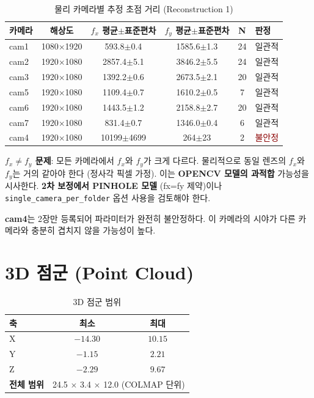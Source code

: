 \documentclass[11pt, a4paper]{report}
\begin{document}
\begin{table}[H]
\centering
\caption{물리 카메라별 추정 초점 거리 (Reconstruction 1)}
\renewcommand{\arraystretch}{1.3}
\small
\begin{tabular}{lccccl}
\toprule
\textbf{카메라} & \textbf{해상도} & \textbf{$f_x$ 평균$\pm$표준편차} & \textbf{$f_y$ 평균$\pm$표준편차} & \textbf{N} & \textbf{판정} \\
\midrule
cam1 & 1080$\times$1920 & 593.8$\pm$0.4 & 1585.6$\pm$1.3 & 24 & \textcolor{thmgreen}{일관적} \\
cam2 & 1920$\times$1080 & 2857.4$\pm$5.1 & 3846.2$\pm$5.5 & 24 & \textcolor{thmgreen}{일관적} \\
cam3 & 1920$\times$1080 & 1392.2$\pm$0.6 & 2673.5$\pm$2.1 & 20 & \textcolor{thmgreen}{일관적} \\
cam5 & 1920$\times$1080 & 1109.4$\pm$0.7 & 1610.2$\pm$0.5 & 7 & \textcolor{thmgreen}{일관적} \\
cam6 & 1920$\times$1080 & 1443.5$\pm$1.2 & 2158.8$\pm$2.7 & 20 & \textcolor{thmgreen}{일관적} \\
cam7 & 1920$\times$1080 & 831.4$\pm$0.7 & 1346.0$\pm$0.4 & 6 & \textcolor{thmgreen}{일관적} \\
cam4 & 1920$\times$1080 & 10199$\pm$4699 & 264$\pm$23 & 2 & \textcolor{darkred}{불안정} \\
\bottomrule
\end{tabular}
\end{table}

\begin{warningbox}
\textbf{$f_x \neq f_y$ 문제}: 모든 카메라에서 $f_x$와 $f_y$가 크게 다르다.
물리적으로 동일 렌즈의 $f_x$와 $f_y$는 거의 같아야 한다 (정사각 픽셀 가정).
이는 \textbf{OPENCV 모델의 과적합} 가능성을 시사한다.
\textbf{2차 보정에서 PINHOLE 모델} (fx=fy 제약)이나
\texttt{single\_camera\_per\_folder} 옵션 사용을 검토해야 한다.

\vspace{0.3cm}
\textbf{cam4}는 2장만 등록되어 파라미터가 완전히 불안정하다.
이 카메라의 시야가 다른 카메라와 충분히 겹치지 않을 가능성이 높다.
\end{warningbox}


\section{3D 점군 (Point Cloud)}

\begin{table}[H]
\centering
\caption{3D 점군 범위}
\renewcommand{\arraystretch}{1.3}
\begin{tabular}{lcc}
\toprule
\textbf{축} & \textbf{최소} & \textbf{최대} \\
\midrule
X & $-14.30$ & $10.15$ \\
Y & $-1.15$ & $2.21$ \\
Z & $-2.29$ & $9.67$ \\
\midrule
\textbf{전체 범위} & \multicolumn{2}{c}{24.5 $\times$ 3.4 $\times$ 12.0 (COLMAP 단위)} \\
\bottomrule
\end{tabular}
\end{table}
\end{document}
